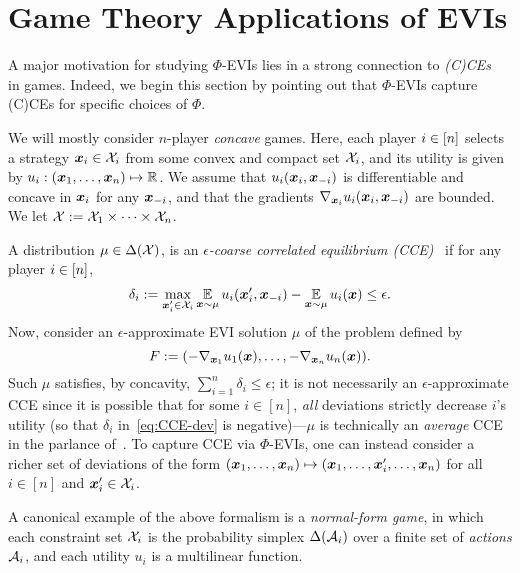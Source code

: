 \section{Game Theory Applications of EVIs}
\label{sec:games}

A major motivation for studying $\Phi$-EVIs lies in a strong connection to \emph{(C)CEs}~\citep{Aumann74:Subjectivity} in games. Indeed, we begin this section by pointing out that $\Phi$-EVIs capture 
(C)CEs for specific choices of $\Phi$. %

We will mostly consider $n$-player \emph{concave} games. Here, each player $i \in [n]$ selects a strategy ${\bm{x}}_i \in {\mathcal{X}}_i$ from some convex and compact set ${\mathcal{X}}_i$, and its utility is given by $u_i : ({\bm{x}}_1, \dots, {\bm{x}}_n) \mapsto \mathbb R$. We assume that $u_i({\bm{x}}_i, {\bm{x}}_{-i})$ is differentiable and concave in ${\bm{x}}_i$ for any ${\bm{x}}_{-i}$, and that the gradients $\nabla_{{\bm{x}}_i} u_i({\bm{x}}_i, {\bm{x}}_{-i})$ are bounded. We let ${\mathcal{X}} := {\mathcal{X}}_1 \times \dots \times {\mathcal{X}}_n$.

\begin{example}[CCE]
    \label{example:CCE}
    A distribution $\mu \in \Delta({\mathcal{X}})$, is an \emph{$\epsilon$-coarse correlated equilibrium (CCE)}~\citep{Moulin78:Strategically} if for any player $i \in [n]$,
    \begin{equation}
        \label{eq:CCE-dev}
        \delta_i :=  \max_{{\bm{x}}_i' \in {\mathcal{X}}_i} \operatorname*{\mathbb E}_{{\bm{x}} \sim \mu} u_i({\bm{x}}_i', {\bm{x}}_{-i})  - \operatorname*{\mathbb E}_{{\bm{x}} \sim \mu} u_i({\bm{x}}) \leq  \epsilon.
    \end{equation}
    Now, consider an $\epsilon$-approximate EVI solution $\mu$ of the problem defined by 
    $$F := ( - \nabla_{{\bm{x}}_1} u_1({\bm{x}}), \dots, - \nabla_{{\bm{x}}_n} u_n({\bm{x}})).$$ 
    Such $\mu$ satisfies, by concavity, $\sum_{i=1}^n \delta_i \leq \epsilon$; it is not necessarily an $\epsilon$-approximate CCE since it is possible that for some $i \in [n]$, {\em all} deviations strictly decrease $i$'s utility (so that $\delta_i$ in~\eqref{eq:CCE-dev} is negative)---$\mu$ is technically an \emph{average} CCE in the parlance of~\citet{Nadav10:Limits}. To capture CCE via $\Phi$-EVIs, one can instead consider a richer set of deviations of the form $({\bm{x}}_1, \dots, {\bm{x}}_n) \mapsto ({\bm{x}}_1, \dots, {\bm{x}}_i', \dots, {\bm{x}}_n)$ for all $i \in [n]$ and ${\bm{x}}_i' \in {\mathcal{X}}_i$.
\end{example}

A canonical example of the above formalism is a \emph{normal-form game}, in which each constraint set ${\mathcal{X}}_i$ is the probability simplex $\Delta({\mathcal{A}}_i)$ over a finite set of \emph{actions} ${\mathcal{A}}_i$, and each utility $u_i$ is a multilinear function.

